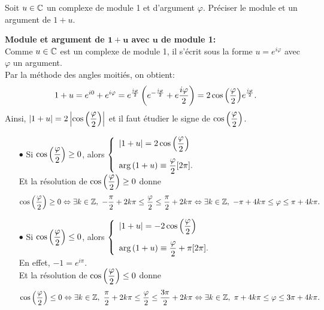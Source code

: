 \documentclass[a4paper, 11pt]{article}
\begin{document}
\begin{exercice}  \;
 Soit $u\in\mathbb{C}$ un complexe de module 1 et d'argument $\varphi$. Pr\'eciser le module et un argument de $1+u$.
\end{exercice}

\begin{correction}   \; \textbf{Module et argument de $\mathbf{1+u}$ avec $\mathbf{u}$ de module 1:}\\
Comme $u\in\mathbb{C}$ est un complexe de module 1, il s'\'ecrit sous la forme $u=e^{i\varphi}$ avec $\varphi$ un argument.\\
Par la m\'ethode des angles moiti\'es, on obtient:
$$
1+u = e^{i0}+e^{i\varphi}= e^{\frac{i\varphi}{2}}\left( e^{-\frac{i\varphi}{2}}+e{\frac{i\varphi}{2}}  \right)= 2\cos{\left(\displaystyle\frac{\varphi}{2}  \right)}e^{\frac{i\varphi}{2}}.$$
Ainsi, $|1+u|=2\left|\cos{\left(\displaystyle\frac{\varphi}{2}\right)}\right|$ et il faut \'etudier le signe de $\cos{\left(\displaystyle\frac{\varphi}{2}\right)}$.
\begin{itemize}
 \item[$\bullet$] Si $\cos{\left(\displaystyle\frac{\varphi}{2}\right)}\geq 0$, alors $\left\lbrace\begin{array}{l}
|1+u|=2\cos{\left(\ddp\frac{\varphi}{2}\right)} \vsec\\
\arg{(1+u)}\equiv \ddp\frac{\varphi}{2}\lbrack 2\pi\rbrack.
\end{array}\right.$\\
Et la r\'esolution de $\cos{\left(\displaystyle\frac{\varphi}{2}\right)}\geq 0$ donne
$$
\cos{\left(\displaystyle\frac{\varphi}{2}\right)}\geq 0  \Leftrightarrow \exists k\in\mathbb{Z},\ -\displaystyle\frac{\pi}{2}+2k\pi\leq \displaystyle\frac{\varphi}{2}\leq \displaystyle\frac{\pi}{2}+2k\pi\Leftrightarrow  \exists k\in\mathbb{Z},\ -\pi+4k\pi\leq \varphi\leq \pi+4k\pi.$$
\item[$\bullet$] Si $\cos{\left(\displaystyle\frac{\varphi}{2}\right)}\leq 0$, alors $\left\lbrace\begin{array}{l}
|1+u|=-2\cos{\left(\ddp\frac{\varphi}{2}\right)} \vsec\\
\arg{(1+u)}\equiv \ddp\frac{\varphi}{2}+\pi\lbrack 2\pi\rbrack.
\end{array}\right.$\\
En effet, $-1=e^{i\pi}$.\\
Et la r\'esolution de $\cos{\left(\displaystyle\frac{\varphi}{2}\right)}\leq 0$ donne
$$
\cos{\left(\displaystyle\frac{\varphi}{2}\right)}\leq 0  \Leftrightarrow \exists k\in\mathbb{Z},\ \displaystyle\frac{\pi}{2}+2k\pi\leq \displaystyle\frac{\varphi}{2}\leq \displaystyle\frac{3\pi}{2}+2k\pi
\Leftrightarrow  \exists k\in\mathbb{Z},\ \pi+4k\pi\leq \varphi\leq 3\pi+4k\pi.$$  
\end{itemize}
\end{correction}
\end{document}
